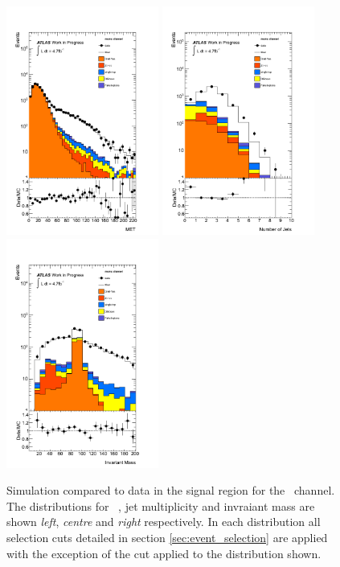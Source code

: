 \begin{figure}[htbp!]
     \begin{center}
     \includegraphics[width=50mm]{f/mumu_control_sig_met_central_double}
     \includegraphics[width=50mm]{f/mumu_control_sig_njet_central_double}
     \includegraphics[width=50mm]{f/mumu_inv_mass_central_double}
     \end{center}
     \caption{Simulation compared to data in the signal region for the \mumu\ channel. The distributions for \etmiss\ , jet multiplicity and invraiant mass are shown \emph{left}, \emph{centre} and \emph{right} respectively. In each distribution all selection cuts detailed in section \ref{sec:event_selection} are applied with the exception of the cut applied to the distribution shown.}
     \label{fig:dilep_control_sig_mumu}
    \end{figure}

